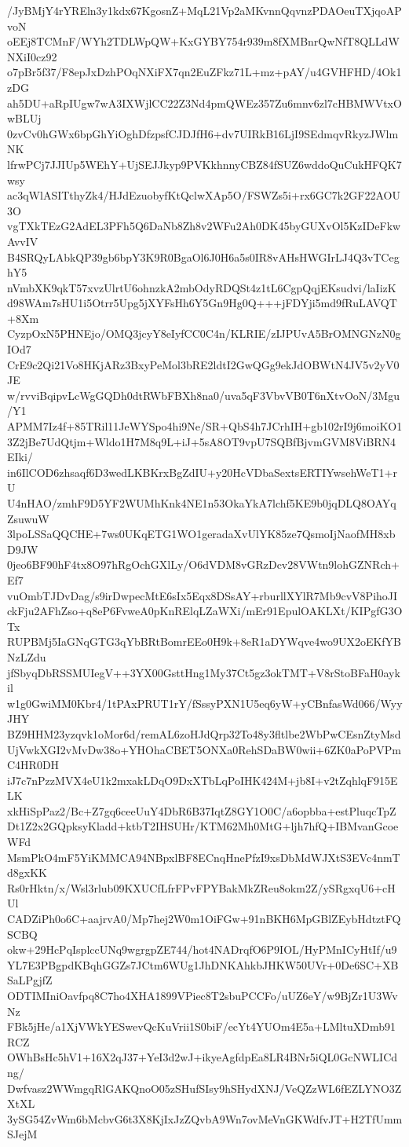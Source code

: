 /JyBMjY4rYREln3y1kdx67KgosnZ+MqL21Vp2aMKvnnQqvnzPDAOeuTXjqoAPvoN
oEEj8TCMnF/WYh2TDLWpQW+KxGYBY754r939m8fXMBnrQwNfT8QLLdWNXiI0cz92
o7pBr5f37/F8epJxDzhPOqNXiFX7qn2EuZFkz71L+mz+pAY/u4GVHFHD/4Ok1zDG
ah5DU+aRpIUgw7wA3IXWjlCC22Z3Nd4pmQWEz357Zu6mnv6zl7cHBMWVtxOwBLUj
0zvCv0hGWx6bpGhYiOghDfzpsfCJDJfH6+dv7UIRkB16LjI9SEdmqvRkyzJWlmNK
lfrwPCj7JJIUp5WEhY+UjSEJJkyp9PVKkhnnyCBZ84fSUZ6wddoQuCukHFQK7wsy
ac3qWlASITthyZk4/HJdEzuobyfKtQclwXAp5O/FSWZs5i+rx6GC7k2GF22AOU3O
vgTXkTEzG2AdEL3PFh5Q6DaNb8Zh8v2WFu2Ah0DK45byGUXvOl5KzIDeFkwAvvIV
B4SRQyLAbkQP39gb6bpY3K9R0BgaOl6J0H6a5s0IR8vAHsHWGIrLJ4Q3vTCeghY5
nVmbXK9qkT57xvzUlrtU6ohnzkA2mbOdyRDQSt4z1tL6CgpQqjEKsudvi/laIizK
d98WAm7sHU1i5Otrr5Upg5jXYFsHh6Y5Gn9Hg0Q+++jFDYji5md9fRuLAVQT+8Xm
CyzpOxN5PHNEjo/OMQ3jcyY8eIyfCC0C4n/KLRIE/zIJPUvA5BrOMNGNzN0gIOd7
CrE9c2Qi21Vo8HKjARz3BxyPeMol3bRE2ldtI2GwQGg9ekJdOBWtN4JV5v2yV0JE
w/rvviBqipvLcWgGQDh0dtRWbFBXh8na0/uva5qF3VbvVB0T6nXtvOoN/3Mgu/Y1
APMM7Iz4f+85TRil11JeWYSpo4hi9Ne/SR+QbS4h7JCrhIH+gb102rI9j6moiKO1
3Z2jBe7UdQtjm+Wldo1H7M8q9L+iJ+5sA8OT9vpU7SQBfBjvmGVM8ViBRN4EIki/
in6IlCOD6zhsaqf6D3wedLKBKrxBgZdIU+y20HcVDbaSextsERTIYwsehWeT1+rU
U4nHAO/zmhF9D5YF2WUMhKnk4NE1n53OkaYkA7lchf5KE9b0jqDLQ8OAYqZsuwuW
3lpoLSSaQQCHE+7ws0UKqETG1WO1geradaXvUlYK85ze7QsmoIjNaofMH8xbD9JW
0jeo6BF90hF4tx8O97hRgOchGXlLy/O6dVDM8vGRzDcv28VWtn9lohGZNRch+Ef7
vuOmbTJDvDag/s9irDwpecMtE6sIx5Eqx8DSsAY+rburllXYlR7Mb9cvV8PihoJI
ckFju2AFhZso+q8eP6FvweA0pKnRElqLZaWXi/mEr91EpulOAKLXt/KIPgfG3OTx
RUPBMj5IaGNqGTG3qYbBRtBomrEEo0H9k+8eR1aDYWqve4wo9UX2oEKfYBNzLZdu
jfSbyqDbRSSMUIegV++3YX00GsttHng1My37Ct5gz3okTMT+V8rStoBFaH0aykil
w1g0GwiMM0Kbr4/1tPAxPRUT1rY/fSssyPXN1U5eq6yW+yCBnfasWd066/WyyJHY
BZ9HHM23yzqvk1oMor6d/remAL6zoHJdQrp32To48y3fltlbe2WbPwCEsnZtyMsd
UjVwkXGI2vMvDw38o+YHOhaCBET5ONXa0RehSDaBW0wii+6ZK0aPoPVPmC4HR0DH
iJ7c7nPzzMVX4eU1k2mxakLDqO9DxXTbLqPoIHK424M+jb8I+v2tZqhlqF915ELK
xkHiSpPaz2/Bc+Z7gq6ceeUuY4DbR6B37IqtZ8GY1O0C/a6opbba+estPluqcTpZ
Dt1Z2x2GQpksyKladd+ktbT2IHSUHr/KTM62Mh0MtG+ljh7hfQ+IBMvanGcoeWFd
MsmPkO4mF5YiKMMCA94NBpxlBF8ECnqHnePfzI9xsDbMdWJXtS3EVc4nmTd8gxKK
Rs0rHktn/x/Wsl3rlub09KXUCfLfrFPvFPYBakMkZReu8okm2Z/ySRgxqU6+cHUl
CADZiPh0o6C+aajrvA0/Mp7hej2W0m1OiFGw+91nBKH6MpGBlZEybHdtztFQSCBQ
okw+29HcPqIsplccUNq9wgrgpZE744/hot4NADrqfO6P9IOL/HyPMnICyHtIf/u9
YL7E3PBgpdKBqhGGZs7JCtm6WUg1JhDNKAhkbJHKW50UVr+0De6SC+XBSaLPgjfZ
ODTIMIniOavfpq8C7ho4XHA1899VPiec8T2sbuPCCFo/uUZ6eY/w9BjZr1U3WvNz
FBk5jHe/a1XjVWkYESwevQcKuVrii1S0biF/ecYt4YUOm4E5a+LMltuXDmb91RCZ
OWhBsHc5hV1+16X2qJ37+YeI3d2wJ+ikyeAgfdpEa8LR4BNr5iQL0GcNWLICdng/
Dwfvasz2WWmgqRlGAKQnoO05zSHufSIsy9hSHydXNJ/VeQZzWL6fEZLYNO3ZXtXL
3ySG54ZvWm6bMcbvG6t3X8KjIxJzZQvbA9Wn7ovMeVnGKWdfvJT+H2TfUmmSJejM
